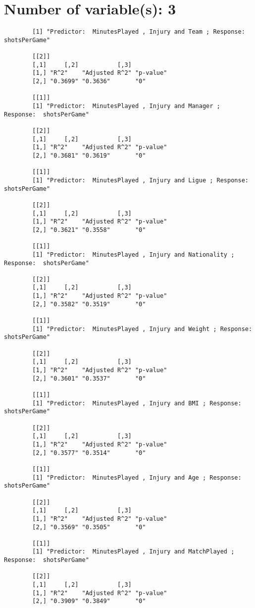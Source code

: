 \documentclass[12pt]{article}
\begin{document}
	\section{Number of variable(s): 3}
	\begin{verbatim}
		[1] "Predictor:  MinutesPlayed , Injury and Team ; Response:  shotsPerGame"
		
		[[2]]
		[,1]     [,2]           [,3]     
		[1,] "R^2"    "Adjusted R^2" "p-value"
		[2,] "0.3699" "0.3636"       "0"      
		
		[[1]]
		[1] "Predictor:  MinutesPlayed , Injury and Manager ; Response:  shotsPerGame"
		
		[[2]]
		[,1]     [,2]           [,3]     
		[1,] "R^2"    "Adjusted R^2" "p-value"
		[2,] "0.3681" "0.3619"       "0"      
		
		[[1]]
		[1] "Predictor:  MinutesPlayed , Injury and Ligue ; Response:  shotsPerGame"
		
		[[2]]
		[,1]     [,2]           [,3]     
		[1,] "R^2"    "Adjusted R^2" "p-value"
		[2,] "0.3621" "0.3558"       "0"      
		
		[[1]]
		[1] "Predictor:  MinutesPlayed , Injury and Nationality ; Response:  shotsPerGame"
		
		[[2]]
		[,1]     [,2]           [,3]     
		[1,] "R^2"    "Adjusted R^2" "p-value"
		[2,] "0.3582" "0.3519"       "0"      
		
		[[1]]
		[1] "Predictor:  MinutesPlayed , Injury and Weight ; Response:  shotsPerGame"
		
		[[2]]
		[,1]     [,2]           [,3]     
		[1,] "R^2"    "Adjusted R^2" "p-value"
		[2,] "0.3601" "0.3537"       "0"      
		
		[[1]]
		[1] "Predictor:  MinutesPlayed , Injury and BMI ; Response:  shotsPerGame"
		
		[[2]]
		[,1]     [,2]           [,3]     
		[1,] "R^2"    "Adjusted R^2" "p-value"
		[2,] "0.3577" "0.3514"       "0"      
		
		[[1]]
		[1] "Predictor:  MinutesPlayed , Injury and Age ; Response:  shotsPerGame"
		
		[[2]]
		[,1]     [,2]           [,3]     
		[1,] "R^2"    "Adjusted R^2" "p-value"
		[2,] "0.3569" "0.3505"       "0"      
		
		[[1]]
		[1] "Predictor:  MinutesPlayed , Injury and MatchPlayed ; Response:  shotsPerGame"
		
		[[2]]
		[,1]     [,2]           [,3]     
		[1,] "R^2"    "Adjusted R^2" "p-value"
		[2,] "0.3909" "0.3849"       "0"      
		

\end{verbatim}
\end{document}
